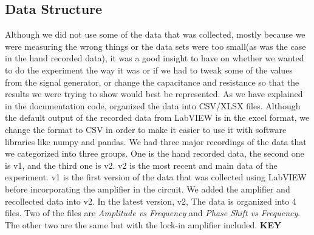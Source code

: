\documentclass[twocolumn]{article}\usepackage[english]{babel}
\begin{document}
\subsection{Data Structure}
Although we did not use some of the data that was collected, mostly because we were measuring the wrong things or the data sets were too small(as was the case in the hand recorded data), it was a good insight to have on whether we wanted to do the experiment the way it was or if we had to tweak some of the values from the signal generator, or change the capacitance and resistance so that the results we were trying to show would best be represented. As we have explained in the documentation code, organized the data into CSV/XLSX files. Although the default output of the recorded data from LabVIEW is in the excel format, we change the format to CSV in order to make it easier to use it with software libraries like numpy and pandas. We had three major recordings of the data that we categorized into three groups. One is the hand recorded data, the second one is v1, and the third one is v2. v2 is the most recent and main data of the experiment. v1 is the first version of the data that was collected using LabVIEW before incorporating the amplifier in the circuit. We added the amplifier and recollected data into v2. In the latest version, v2, The data is organized into 4 files. Two of the files are \textit{Amplitude vs Frequency} and \textit{Phase Shift vs Frequency}. The other two are the same but with the lock-in amplifier included. \newline \newline \newline \newline \newline \newline \newline \newline \newline \newline \newline \newline \newline \newline \newline \newline \newline \newline \newline \newline \textbf{KEY}
\end{document}
